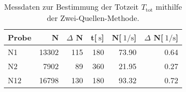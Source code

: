 
\begin{table}[!h]
\begin{center}
\begin{tabular}{|l|r|r|r|r|r|}
\hline
Probe & N & $\Delta$ N & t[$\SI{}{\second}$] & N[$\SI{}{1\per\second}$] & $\Delta$ N[$\SI{}{1\per\second}$]\\
\hline
\hline
N1 & 13302	& 115 & 180 & 73.90 & 0.64 \\
N2 & 7902	& 89  & 360 & 21.95 & 0.27 \\
N12 & 16798	& 130 & 180 & 93.32 & 0.72 \\
\hline
\end{tabular}
\caption[Aufgabe d]{Messdaten zur Bestimmung der Totzeit $T_\mathrm{tot}$ mithilfe der Zwei-Quellen-Methode.}
\label{tabelled}
\end{center}
\end{table}
